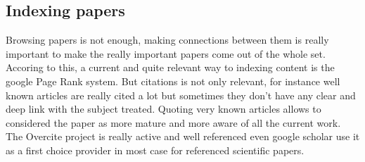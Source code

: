 \subsection{Indexing papers}

Browsing papers is not enough, making connections between them is really important to make the really 
important papers come out of the whole set. Accoring to this, a current and quite relevant way to
indexing content is the google Page Rank system. But citations is not only relevant, for instance 
well known articles are really cited a lot but sometimes they don't have any clear and deep link 
with the subject treated. Quoting very known articles allows to considered the paper as more mature
and more aware of all the current work. The Overcite project is really \cite{Lawrence99digitallibraries}
active and well referenced even google scholar use it as a first choice provider in most case 
for referenced scientific papers.
\subsection{}

\cite{Reynolds_efficientpeer-to-peer}
\cite{Huebsch:2003:QIP:1315451.1315480}
\cite{Cohen03incentivesbuild}
